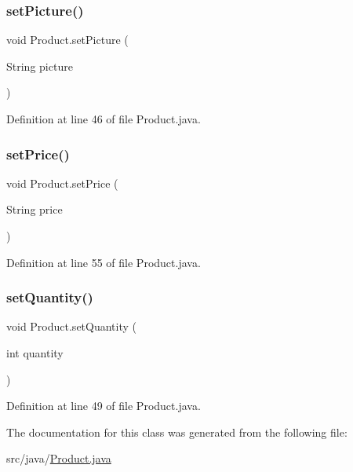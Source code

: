 \mbox{\label{class_product_ad04da42d2b2912956e849a8246ee3403}} 
\subsubsection{\texorpdfstring{setPicture()}{setPicture()}}
{\footnotesize\ttfamily void Product.\+set\+Picture (\begin{DoxyParamCaption}\item[{String}]{picture }\end{DoxyParamCaption})}



Definition at line 46 of file Product.\+java.

\mbox{\label{class_product_a58a8d85fcc80621b05492093b025e173}} 
\subsubsection{\texorpdfstring{setPrice()}{setPrice()}}
{\footnotesize\ttfamily void Product.\+set\+Price (\begin{DoxyParamCaption}\item[{String}]{price }\end{DoxyParamCaption})}



Definition at line 55 of file Product.\+java.

\mbox{\label{class_product_a8a0578b77798b2ff33b585cc599f3172}} 
\subsubsection{\texorpdfstring{setQuantity()}{setQuantity()}}
{\footnotesize\ttfamily void Product.\+set\+Quantity (\begin{DoxyParamCaption}\item[{int}]{quantity }\end{DoxyParamCaption})}



Definition at line 49 of file Product.\+java.



The documentation for this class was generated from the following file\+:\begin{DoxyCompactItemize}
\item 
src/java/\mbox{\hyperlink{_product_8java}{Product.\+java}}\end{DoxyCompactItemize}
